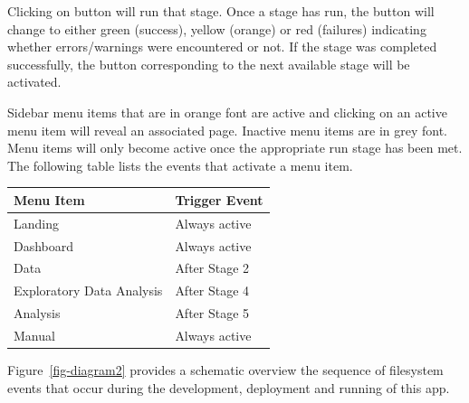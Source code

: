 \documentclass[
  8pt,
  a4paper]{article}
\begin{document}
Clicking on button will run that stage. Once a stage has run, the button
will change to either green (success), yellow (orange) or red (failures)
indicating whether errors/warnings were encountered or not. If the stage
was completed successfully, the button corresponding to the next
available stage will be activated.

Sidebar menu items that are in orange font are active and clicking on an
active menu item will reveal an associated page. Inactive menu items are
in grey font. Menu items will only become active once the appropriate
run stage has been met. The following table lists the events that
activate a menu item.

\begin{longtable}[]{@{}ll@{}}
\toprule\noalign{}
Menu Item & Trigger Event \\
\midrule\noalign{}
\endhead
\bottomrule\noalign{}
\endlastfoot
Landing & Always active \\
Dashboard & Always active \\
Data & After Stage 2 \\
Exploratory Data Analysis & After Stage 4 \\
Analysis & After Stage 5 \\
Manual & Always active \\
\end{longtable}

Figure~\ref{fig-diagram2} provides a schematic overview the sequence of
filesystem events that occur during the development, deployment and
running of this app.
\end{document}
